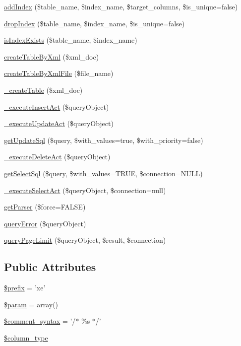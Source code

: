 \begin{DoxyCompactItemize}
\item 
\hyperlink{classDBMssql_a6202a3b8e96252f91ef104a854cf556c}{add\+Index} (\$table\+\_\+name, \$index\+\_\+name, \$target\+\_\+columns, \$is\+\_\+unique=false)
\item 
\hyperlink{classDBMssql_a83bea7f71705370699eac384c5f93088}{drop\+Index} (\$table\+\_\+name, \$index\+\_\+name, \$is\+\_\+unique=false)
\item 
\hyperlink{classDBMssql_a17723942b3686527a68b72a1740136c3}{is\+Index\+Exists} (\$table\+\_\+name, \$index\+\_\+name)
\item 
\hyperlink{classDBMssql_a7a3ff51c1a29e47c02f358dc6064d88b}{create\+Table\+By\+Xml} (\$xml\+\_\+doc)
\item 
\hyperlink{classDBMssql_ae136845dee2ecc1bd8fe3a7c535572f4}{create\+Table\+By\+Xml\+File} (\$file\+\_\+name)
\item 
\hyperlink{classDBMssql_a0705365081b34014652f440380c53519}{\+\_\+create\+Table} (\$xml\+\_\+doc)
\item 
\hyperlink{classDBMssql_aa3f04ce5bee8d9e11db7de7293055fef}{\+\_\+execute\+Insert\+Act} (\$query\+Object)
\item 
\hyperlink{classDBMssql_a855a8b1b61f7840ce057f72fa5a39300}{\+\_\+execute\+Update\+Act} (\$query\+Object)
\item 
\hyperlink{classDBMssql_a10dad79ab29a55301ef2327fb27f86aa}{get\+Update\+Sql} (\$query, \$with\+\_\+values=true, \$with\+\_\+priority=false)
\item 
\hyperlink{classDBMssql_a871bd07e7224b27daba828686ee57a8a}{\+\_\+execute\+Delete\+Act} (\$query\+Object)
\item 
\hyperlink{classDBMssql_a37ed6e799c12ecafdea33d6fb0a84f87}{get\+Select\+Sql} (\$query, \$with\+\_\+values=T\+R\+U\+E, \$connection=N\+U\+L\+L)
\item 
\hyperlink{classDBMssql_a819a9181e9f34ce00f6f2d8a273813a6}{\+\_\+execute\+Select\+Act} (\$query\+Object, \$connection=null)
\item 
\hyperlink{classDBMssql_aa67e4dcd0df911a7c4e6325f21f0fb04}{get\+Parser} (\$force=F\+A\+L\+S\+E)
\item 
\hyperlink{classDBMssql_adeea6fd6090140a4b81051c5ff68cdfe}{query\+Error} (\$query\+Object)
\item 
\hyperlink{classDBMssql_a5a63ce969c396b656ac50e2251e798b9}{query\+Page\+Limit} (\$query\+Object, \$result, \$connection)
\end{DoxyCompactItemize}
\subsection*{Public Attributes}
\begin{DoxyCompactItemize}
\item 
\hyperlink{classDBMssql_a733cd192b424b5a66ea14e3e62391844}{\$prefix} = 'xe'
\item 
\hyperlink{classDBMssql_a352ee40852cea6dc20de096486603805}{\$param} = array()
\item 
\hyperlink{classDBMssql_ad095d953d508f44a326586a10c95336d}{\$comment\+\_\+syntax} = '/$\ast$ \%s $\ast$/'
\item 
\hyperlink{classDBMssql_a785e589df00c87bb0003b573aa5d7fee}{\$column\+\_\+type}
\end{DoxyCompactItemize}
